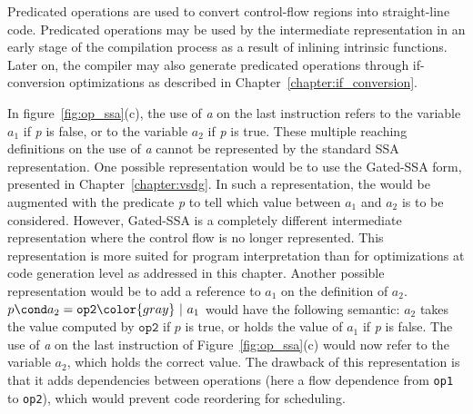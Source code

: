 
Predicated operations are used to convert control-flow regions into
straight-line code. Predicated operations may be used by the intermediate
representation in an early stage of the compilation process as a result of inlining intrinsic functions. Later on, the compiler may
also generate predicated operations through if-conversion optimizations
as described in Chapter~\ref{chapter:if_conversion}.


In figure~\ref{fig:op_ssa}(c), the use of \textit{a} on the last
instruction refers to the variable ${a_1}$ if \textit{p} is false, or
to the variable ${a_2}$ if \textit{p} is true. These multiple
reaching definitions on the use of \textit{a} cannot be represented by
the standard SSA representation.
%
One possible representation would be to use the Gated-SSA form,
presented in Chapter~\ref{chapter:vsdg}. In such a representation, the
\phifun would be augmented with the predicate \textit{p} to tell
which value between ${a_1}$ and ${a_2}$ is to be
considered. However, Gated-SSA is a completely different intermediate
representation where the control flow is no longer represented. This
representation is more suited for program interpretation than for optimizations at code generation level as addressed in this chapter.
%
Another possible representation would be to add a reference to ${a_1}$
 on the definition of ${a_2}$. $p\cond a_2=\texttt{op2} {\color{gray}~|~a_1}$ 
would have the following semantic: ${a_2}$ takes the value computed by $\texttt{op2}$ if $p$ is true, or holds
the value of ${a_1}$ if \textit{p} is {false}. The use of \textit{a} on the last instruction of Figure~\ref{fig:op_ssa}(c)
would now refer to the variable ${a_2}$, which holds the correct
value. The drawback of this representation is that it adds
dependencies between operations (here a flow dependence from \texttt{op1} to \texttt{op2}), which would prevent code reordering
for scheduling.

